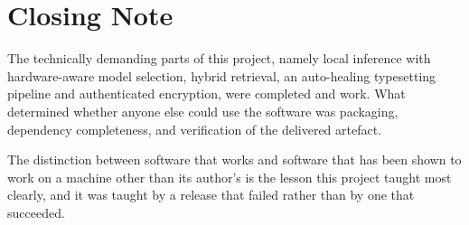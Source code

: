 \documentclass[11pt,a4paper]{article}
\begin{document}
\section{Closing Note}

The technically demanding parts of this project, namely local inference with
hardware-aware model selection, hybrid retrieval, an auto-healing typesetting
pipeline and authenticated encryption, were completed and work. What determined
whether anyone else could use the software was packaging, dependency
completeness, and verification of the delivered artefact.

The distinction between software that works and software that has been shown to
work on a machine other than its author's is the lesson this project taught most
clearly, and it was taught by a release that failed rather than by one that
succeeded.
\end{document}
